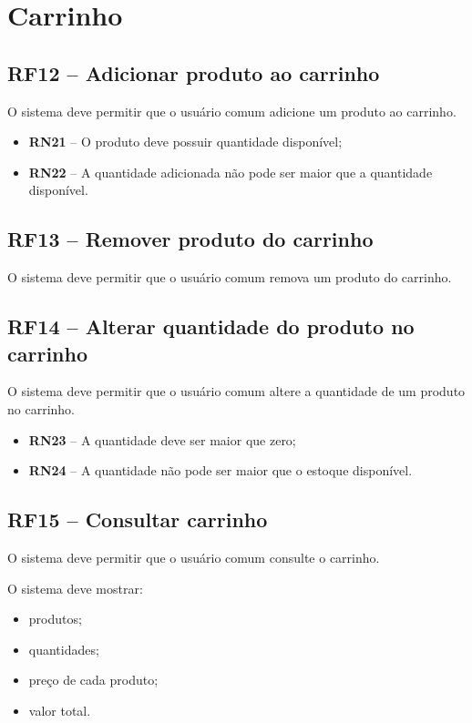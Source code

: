 \documentclass{scrreprt}
\newenvironment{fieldlist}
	{\renewcommand{\labelitemi}{--}\begin{itemize}}
	{\end{itemize}}
\begin{document}
\section{Carrinho}

\subsection{RF12 -- Adicionar produto ao carrinho}
O sistema deve permitir que o usuário comum adicione um produto ao carrinho.
\begin{itemize}
	\item \textbf{RN21} -- O produto deve possuir quantidade disponível;
	\item \textbf{RN22} -- A quantidade adicionada não pode ser maior que a quantidade disponível.
\end{itemize}

\subsection{RF13 -- Remover produto do carrinho}
O sistema deve permitir que o usuário comum remova um produto do carrinho.

\subsection{RF14 -- Alterar quantidade do produto no carrinho}
O sistema deve permitir que o usuário comum altere a quantidade de um produto no carrinho.
\begin{itemize}
	\item \textbf{RN23} -- A quantidade deve ser maior que zero;
	\item \textbf{RN24} -- A quantidade não pode ser maior que o estoque disponível.
\end{itemize}

\subsection{RF15 -- Consultar carrinho}
O sistema deve permitir que o usuário comum consulte o carrinho.

O sistema deve mostrar:
\begin{fieldlist}
	\item produtos;
	\item quantidades;
	\item preço de cada produto;
	\item valor total.
\end{fieldlist}
\end{document}
